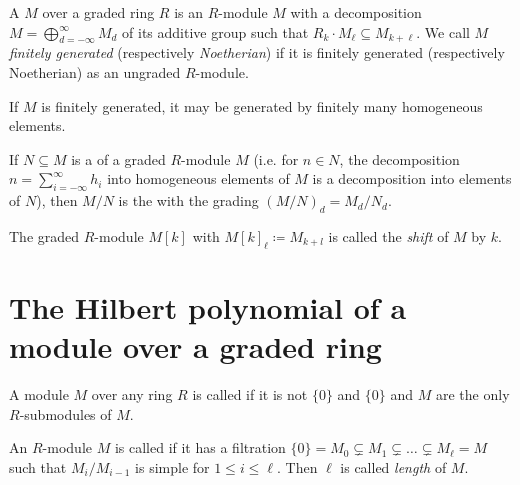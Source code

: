 \documentclass[a4paper,parskip=half,numbers=enddot, DIV=12]{scrreprt}
\begin{document}
\begin{defi}
    A  $M$ over a graded ring $R$ is an $R$-module $M$ with a decomposition $M=\bigoplus_{d=-\infty}^\infty M_d$ of its additive group such that $R_k\cdot M_\ell \subseteq M_{k+\ell}$. We call $M$ \emph{finitely generated} (respectively \emph{Noetherian}) if it is finitely generated (respectively Noetherian) as an ungraded $R$-module. 
\end{defi}
\begin{rem}
    If $M$ is finitely generated, it may be generated by finitely many homogeneous elements.
\end{rem}
\begin{defi}
    \begin{alphanumerate}
        \item {}
            If $N\subseteq M$ is a  of a graded $R$-module $M$ (i.e. for $n\in N$, the decomposition $n=\sum_{i=-\infty}^\infty h_i$ into homogeneous elements of $M$ is a decomposition into elements of $N$), then $M/N$ is the  with the grading $(M/N)_d = M_d/N_d$.
        \item   
            The graded $R$-module $M[k]$ with $M[k]_\ell \coloneqq M_{k+l}$ is called the \emph{shift} of $M$ by $k$.
    \end{alphanumerate}
\end{defi}

\section{The Hilbert polynomial of a module over a graded ring}

\begin{defi}
    \begin{alphanumerate}
    \item 
        A module $M$ over any ring $R$ is called  if it is not $\{0\}$ and $\{0\}$ and $M$ are the only $R$-submodules of $M$.
    \item {}
        An $R$-module $M$ is called  if it has a filtration $\{0\} = M_0\subsetneq M_1\subsetneq\ldots\subsetneq M_\ell = M$ such that $M_i/M_{i-1}$ is simple for $1\leq i\leq\ell$. Then $\ell$ is called \emph{length} of $M$. 
    \end{alphanumerate}
\end{defi}
\end{document}
